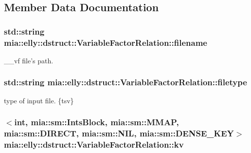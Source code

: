 \subsection{Member Data Documentation}
\hypertarget{classmia_1_1elly_1_1dstruct_1_1_variable_factor_relation_a582e0a5fb2699076d5ec719a32613129}{
\subsubsection[{filename}]{\setlength{\rightskip}{0pt plus 5cm}std\-::string mia\-::elly\-::dstruct\-::\-Variable\-Factor\-Relation\-::filename}}\label{classmia_1_1elly_1_1dstruct_1_1_variable_factor_relation_a582e0a5fb2699076d5ec719a32613129}
\-\_\-\-\_\-vf file's path. \hypertarget{classmia_1_1elly_1_1dstruct_1_1_variable_factor_relation_a14811849a23c099c5d1d9abb718f3d9f}{
\subsubsection[{filetype}]{\setlength{\rightskip}{0pt plus 5cm}std\-::string mia\-::elly\-::dstruct\-::\-Variable\-Factor\-Relation\-::filetype}}\label{classmia_1_1elly_1_1dstruct_1_1_variable_factor_relation_a14811849a23c099c5d1d9abb718f3d9f}
type of input file. \{tsv\} \hypertarget{classmia_1_1elly_1_1dstruct_1_1_variable_factor_relation_ac009b6fd58e9f29f389e4c274abf1335}{
\subsubsection[{kv}]{$<$int, {\bf mia\-::sm\-::\-Ints\-Block}, mia\-::sm\-::\-M\-M\-A\-P, mia\-::sm\-::\-D\-I\-R\-E\-C\-T, mia\-::sm\-::\-N\-I\-L, mia\-::sm\-::\-D\-E\-N\-S\-E\-\_\-\-K\-E\-Y$>$ mia\-::elly\-::dstruct\-::\-Variable\-Factor\-Relation\-::kv}}\label{classmia_1_1elly_1_1dstruct_1_1_variable_factor_relation_ac009b6fd58e9f29f389e4c274abf1335}
